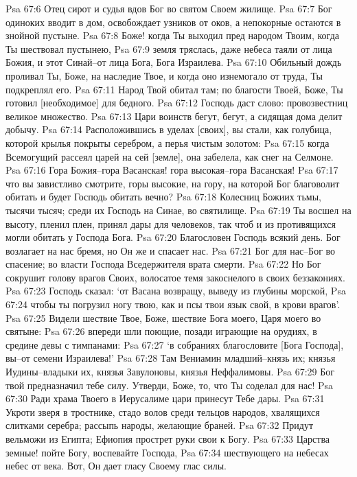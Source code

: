 Psa 67:6  Отец сирот и судья вдов Бог во святом Своем жилище.
Psa 67:7  Бог одиноких вводит в дом, освобождает узников от оков, а непокорные остаются в знойной пустыне.
Psa 67:8  Боже! когда Ты выходил пред народом Твоим, когда Ты шествовал пустынею,
Psa 67:9  земля тряслась, даже небеса таяли от лица Божия, и этот Синай--от лица Бога, Бога Израилева.
Psa 67:10  Обильный дождь проливал Ты, Боже, на наследие Твое, и когда оно изнемогало от труда, Ты подкреплял его.
Psa 67:11  Народ Твой обитал там; по благости Твоей, Боже, Ты готовил [необходимое] для бедного.
Psa 67:12  Господь даст слово: провозвестниц великое множество.
Psa 67:13  Цари воинств бегут, бегут, а сидящая дома делит добычу.
Psa 67:14  Расположившись в уделах [своих], вы стали, как голубица, которой крылья покрыты серебром, а перья чистым золотом:
Psa 67:15  когда Всемогущий рассеял царей на сей [земле], она забелела, как снег на Селмоне.
Psa 67:16  Гора Божия--гора Васанская! гора высокая--гора Васанская!
Psa 67:17  что вы завистливо смотрите, горы высокие, на гору, на которой Бог благоволит обитать и будет Господь обитать вечно?
Psa 67:18  Колесниц Божиих тьмы, тысячи тысяч; среди их Господь на Синае, во святилище.
Psa 67:19  Ты восшел на высоту, пленил плен, принял дары для человеков, так чтоб и из противящихся могли обитать у Господа Бога.
Psa 67:20  Благословен Господь всякий день. Бог возлагает на нас бремя, но Он же и спасает нас.
Psa 67:21  Бог для нас--Бог во спасение; во власти Господа Вседержителя врата смерти.
Psa 67:22  Но Бог сокрушит голову врагов Своих, волосатое темя закоснелого в своих беззакониях.
Psa 67:23  Господь сказал: `от Васана возвращу, выведу из глубины морской,
Psa 67:24  чтобы ты погрузил ногу твою, как и псы твои язык свой, в крови врагов'.
Psa 67:25  Видели шествие Твое, Боже, шествие Бога моего, Царя моего во святыне:
Psa 67:26  впереди шли поющие, позади играющие на орудиях, в средине девы с тимпанами:
Psa 67:27  `в собраниях благословите [Бога Господа], вы--от семени Израилева!'
Psa 67:28  Там Вениамин младший--князь их; князья Иудины--владыки их, князья Завулоновы, князья Неффалимовы.
Psa 67:29  Бог твой предназначил тебе силу. Утверди, Боже, то, что Ты соделал для нас!
Psa 67:30  Ради храма Твоего в Иерусалиме цари принесут Тебе дары.
Psa 67:31  Укроти зверя в тростнике, стадо волов среди тельцов народов, хвалящихся слитками серебра; рассыпь народы, желающие браней.
Psa 67:32  Придут вельможи из Египта; Ефиопия прострет руки свои к Богу.
Psa 67:33  Царства земные! пойте Богу, воспевайте Господа,
Psa 67:34  шествующего на небесах небес от века. Вот, Он дает гласу Своему глас силы.
